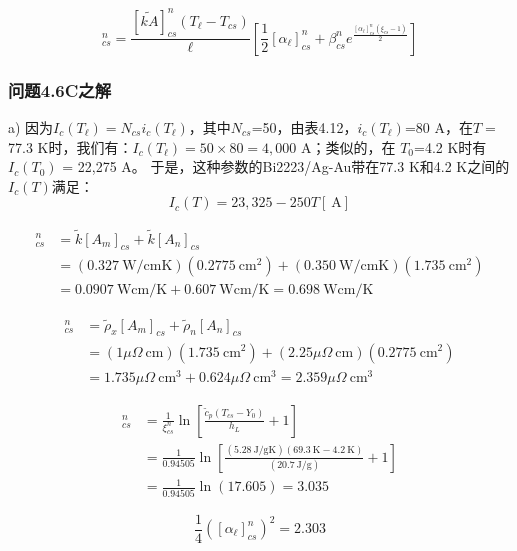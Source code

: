 \begin{equation}%
[Q_j]_{cs}^{n}=\frac{[\tilde{kA}]_{cs}^{n}(T_\ell-T_{cs})}{\ell}\left[\frac{1}{2}[\alpha_\ell]_{cs}^{n}+\beta_{cs}^{n}e^{\frac{[\alpha_\ell]_{cs}^{n}(\xi_{cs}-1)}{2}}\right]
\end{equation}

\subsubsection{问题4.6C之解}
a) 因为$I_c(T_\ell)=N_{cs}i_c(T_\ell)$，其中$N_{cs}$=50，由表4.12，$i_c(T_\ell)$=80 A，在$T=$77.3 K时，我们有：$I_c(T_\ell)= 50\times 80= 4,000$ A；类似的，在
$T_0$=4.2 K时有$I_c(T_0)$ = 22,275 A。
于是，这种参数的Bi2223/Ag-Au带在77.3 K和4.2 K之间的$I_c(T)$满足：
\begin{equation}
 I_c(T)=23,325-250T[\ \mathrm{A}]
\end{equation}

\begin{align}%
[\tilde{kA}]_{cs}^{n}&=\tilde{k}[A_m]_{cs}+\tilde{k}[A_n]_{cs} \\
&=(0.327\ \mathrm{W/cmK})(0.2775\ \mathrm{cm^2})+(0.350\ \mathrm{W/cmK})(1.735\ \mathrm{cm^2}) \\
&=0.0907\ \mathrm{W cm/K}+0.607\ \mathrm{W cm/K}=0.698\ \mathrm{W cm/K}
\end{align}

\begin{align}%
[\tilde{\rho A}]_{cs}^{n}&=\tilde{\rho}_x[A_m]_{cs}+\tilde{\rho}_n[A_n]_{cs} \\
&=(1\mu\Omega\ \mathrm{cm})(1.735\ \mathrm{cm^2})+(2.25\mu\Omega\ \mathrm{cm})(0.2775\ \mathrm{cm^2}) \\
&=1.735\mu\Omega\ \mathrm{cm^3}+0.624\mu\Omega\ \mathrm{cm^3}=2.359\mu\Omega\ \mathrm{cm^3}
\end{align}

\begin{align}%
[\alpha_\ell]_{cs}^{n}&=\frac{1}{\xi_{cs}^{n}}\ln\left[\frac{\tilde{c}_p(T_{cs}-Y_0)}{h_L}+1\right] \\
&=\frac{1}{0.94505}\ln\left[\frac{(5.28\ \mathrm{J/gK})(69.3\ \mathrm{K}-4.2\ \mathrm{K})}{(20.7\ \mathrm{J/g})}+1\right] \\
&=\frac{1}{0.94505}\ln(17.605)=3.035
\end{align}

\begin{equation}
\frac{1}{4}([\alpha_\ell]_{cs}^{n})^2=2.303
\end{equation}

